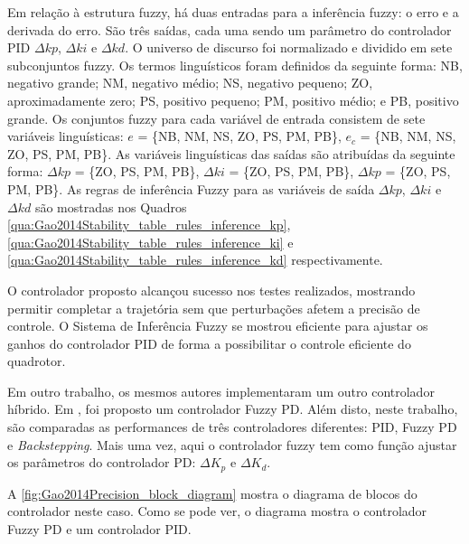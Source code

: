 Em relação à estrutura fuzzy, há duas entradas para a inferência fuzzy: o erro e a derivada do erro. São três saídas, cada uma sendo um parâmetro do controlador PID $\Delta kp$, $\Delta ki$ e $\Delta kd$. O universo de discurso foi normalizado e dividido em sete subconjuntos fuzzy. Os termos linguísticos foram definidos da seguinte forma: NB, negativo grande; NM, negativo médio; NS, negativo pequeno; ZO, aproximadamente zero; PS, positivo pequeno; PM, positivo médio; e PB, positivo grande. Os conjuntos fuzzy para cada variável de entrada consistem de sete variáveis linguísticas: $e$ = \{NB, NM, NS, ZO, PS, PM, PB\}, $e_c$ = \{NB, NM, NS, ZO, PS, PM, PB\}. As variáveis linguísticas das saídas são atribuídas da seguinte forma: $\Delta kp$ = \{ZO, PS, PM, PB\}, $\Delta ki$ = \{ZO, PS, PM, PB\}, $\Delta kp$ = \{ZO, PS, PM, PB\}. As regras de inferência Fuzzy para as variáveis de saída $\Delta kp$, $\Delta ki$ e $\Delta kd$ são mostradas nos Quadros \ref{qua:Gao2014Stability_table_rules_inference_kp}, \ref{qua:Gao2014Stability_table_rules_inference_ki} e \ref{qua:Gao2014Stability_table_rules_inference_kd} respectivamente.







O controlador proposto alcançou sucesso nos testes realizados, mostrando permitir completar a trajetória sem que perturbações afetem a precisão de controle. O Sistema de Inferência Fuzzy se mostrou eficiente para ajustar os ganhos do controlador PID de forma a possibilitar o controle eficiente do quadrotor.

Em outro trabalho, os mesmos autores implementaram um outro controlador híbrido. Em \cite{Gao2014Precision}, foi proposto um controlador Fuzzy PD. Além disto, neste trabalho, são comparadas as performances de três controladores diferentes: PID, Fuzzy PD e \textit{Backstepping}. Mais uma vez, aqui o controlador fuzzy tem como função ajustar os parâmetros do controlador PD: $\Delta K_p$ e $\Delta K_d$.

A \autoref{fig:Gao2014Precision_block_diagram} mostra o diagrama de blocos do controlador neste caso. Como se pode ver, o diagrama mostra o controlador Fuzzy PD e um controlador PID.


